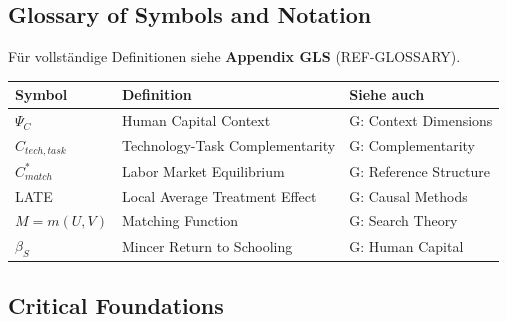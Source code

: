 \subsection{Glossary of Symbols and Notation}
\label{sec:aa-glossary}

Für vollständige Definitionen siehe \textbf{Appendix GLS} (REF-GLOSSARY).

\begin{center}
\renewcommand{\arraystretch}{1.3}
\begin{tabular}{|l|l|l|}
\hline
\textbf{Symbol} & \textbf{Definition} & \textbf{Siehe auch} \\
\hline
$\Psi_C$ & Human Capital Context & G: Context Dimensions \\
$C_{tech, task}$ & Technology-Task Complementarity & G: Complementarity \\
$C^*_{match}$ & Labor Market Equilibrium & G: Reference Structure \\
LATE & Local Average Treatment Effect & G: Causal Methods \\
$M = m(U,V)$ & Matching Function & G: Search Theory \\
$\beta_S$ & Mincer Return to Schooling & G: Human Capital \\
\hline
\end{tabular}
\end{center}

\subsection{Critical Foundations}
\label{sec:aa-foundations}

